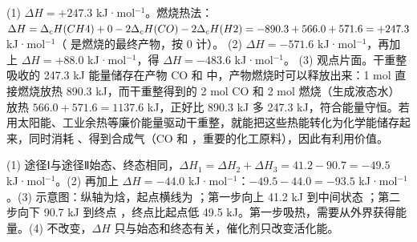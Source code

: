 \begin{jiexilist}
\item (1) $\Delta H=+247.3$ kJ·mol$^{-1}$。燃烧热法：$\Delta H=\Delta_cH(CH4)+0-2\Delta_cH(CO)-2\Delta_cH(H2)=-890.3+566.0+571.6=+247.3$ kJ·mol$^{-1}$（ 是燃烧的最终产物，按 0 计）。
(2)  $\Delta H=-571.6$ kJ·mol$^{-1}$，再加上  $\Delta H=+88.0$ kJ·mol$^{-1}$，得 $\Delta H=-483.6$ kJ·mol$^{-1}$。
(3) 观点片面。干重整吸收的 247.3 kJ 能量储存在产物 CO 和  中，产物燃烧时可以释放出来：1 mol  直接燃烧放热 890.3 kJ，而干重整得到的 2 mol CO 和 2 mol  燃烧（生成液态水）放热 $566.0+571.6=1137.6$ kJ，正好比 890.3 kJ 多 247.3 kJ，符合能量守恒。若用太阳能、工业余热等廉价能量驱动干重整，就能把这些热能转化为化学能储存起来，同时消耗 、得到合成气（CO 和 ，重要的化工原料），因此有利用价值。
\item (1) 途径Ⅰ与途径Ⅱ始态、终态相同，$\Delta H_1=\Delta H_2+\Delta H_3=41.2-90.7=-49.5$ kJ·mol$^{-1}$。(2) 再加上  $\Delta H=-44.0$ kJ·mol$^{-1}$：$-49.5-44.0=-93.5$ kJ·mol$^{-1}$。(3) 示意图：纵轴为焓，起点横线为 ；第一步向上 41.2 kJ 到中间状态 ；第二步向下 90.7 kJ 到终点 ，终点比起点低 49.5 kJ。第一步吸热，需要从外界获得能量。(4) 不改变，$\Delta H$ 只与始态和终态有关，催化剂只改变活化能。
\end{jiexilist}
